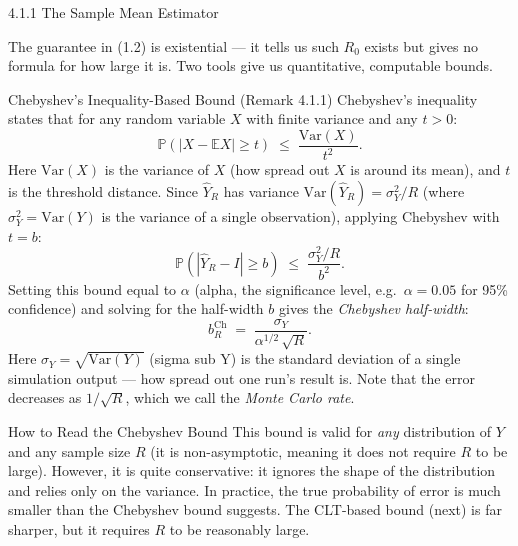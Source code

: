 \documentclass[aspectratio=169,10pt]{beamer}
\begin{document}
\begin{frame}[allowframebreaks]{4.1.1 The Sample Mean Estimator}
\framebreak

The guarantee in (1.2) is existential --- it tells us such $R_0$ exists
but gives no formula for how large it is.  Two tools give us quantitative,
computable bounds.

\begin{block}{Chebyshev's Inequality-Based Bound (Remark 4.1.1)}
  Chebyshev's inequality states that for any random variable $X$ with
  finite variance and any $t > 0$:
  \[
    \mathbb{P}(|X - \mathbb{E}X| \geq t) \;\leq\; \frac{\mathrm{Var}(X)}{t^2}.
  \]
  Here $\mathrm{Var}(X)$ is the variance of $X$ (how spread out $X$ is
  around its mean), and $t$ is the threshold distance.  Since
  $\hat{Y}_R$ has variance $\mathrm{Var}(\hat{Y}_R) = \sigma_Y^2/R$
  (where $\sigma_Y^2 = \mathrm{Var}(Y)$ is the variance of a single
  observation), applying Chebyshev with $t = b$:
  \[
    \mathbb{P}(|\hat{Y}_R - I| \geq b) \;\leq\; \frac{\sigma_Y^2/R}{b^2}.
  \]
  Setting this bound equal to $\alpha$ (alpha, the significance level,
  e.g.\ $\alpha = 0.05$ for 95\% confidence) and solving for the
  half-width $b$ gives the \emph{Chebyshev half-width}:
  \[
    b_R^{\mathrm{Ch}} \;=\; \frac{\sigma_Y}{\alpha^{1/2}\,\sqrt{R}}.
    \tag{1.3}
  \]
  Here $\sigma_Y = \sqrt{\mathrm{Var}(Y)}$ (sigma sub Y) is the
  standard deviation of a single simulation output --- how spread out
  one run's result is.  Note that the error decreases as $1/\sqrt{R}$,
  which we call the \emph{Monte Carlo rate}.
\end{block}

\begin{alertblock}{How to Read the Chebyshev Bound}
  This bound is valid for \emph{any} distribution of $Y$ and any
  sample size $R$ (it is non-asymptotic, meaning it does not require
  $R$ to be large).  However, it is quite conservative: it ignores
  the shape of the distribution and relies only on the variance.  In
  practice, the true probability of error is much smaller than the
  Chebyshev bound suggests.  The CLT-based bound (next) is far sharper,
  but it requires $R$ to be reasonably large.
\end{alertblock}

\framebreak


\end{frame}
\end{document}
